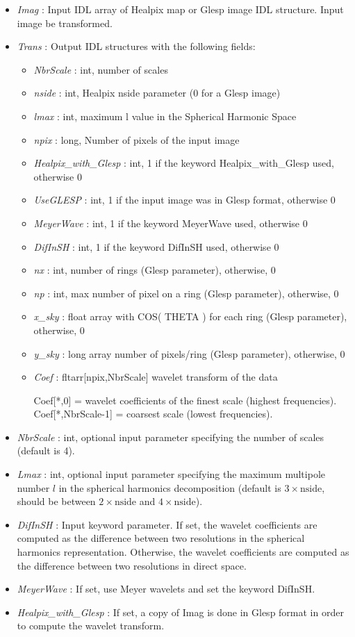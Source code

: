 \begin{itemize}
\item {\em Imag} : Input IDL array of Healpix map or Glesp image IDL structure. Input image be transformed. 
\item {\em Trans} : Output IDL structures with the following fields:
\begin{itemize}
\item {\em NbrScale} : int, number of scales
\item {\em nside} : int, Healpix nside parameter (0 for a Glesp image)
\item {\em lmax} : int, maximum l value in the Spherical Harmonic Space
\item {\em npix} : long, Number of pixels of the input image
\item {\em Healpix\_with\_Glesp} : int, 1 if the keyword Healpix\_with\_Glesp used, otherwise 0
\item {\em UseGLESP} : int, 1 if the input image was in Glesp format, otherwise 0
\item {\em MeyerWave} : int, 1 if the keyword MeyerWave used, otherwise 0
\item {\em DifInSH} : int, 1 if the keyword DifInSH used, otherwise 0
\item {\em nx} : int, number of rings (Glesp parameter), otherwise, 0
\item {\em np} : int, max number of pixel on a ring (Glesp parameter), otherwise, 0
\item {\em x\_sky} : float array with COS( THETA ) for each ring (Glesp parameter), otherwise, 0
\item {\em y\_sky} : long array number of pixels/ring (Glesp parameter), otherwise, 0
\item {\em Coef} : fltarr[npix,NbrScale] wavelet transform of the data
\begin{center}
Coef[*,0] = wavelet coefficients of the finest scale (highest frequencies).\\
Coef[*,NbrScale-1] = coarsest scale (lowest frequencies). 
\end{center}
\end{itemize}
\item {\em NbrScale} : int, optional input parameter specifying the number of scales (default is 4).
\item {\em Lmax} : int, optional input parameter specifying the maximum multipole number $l$ in the spherical harmonics decomposition 
(default is $3\times \textrm{nside}$, should be between $2\times \textrm{nside}$ and $4\times \textrm{nside}$).
\item {\em DifInSH} : Input keyword parameter. If set, the wavelet coefficients are computed as the difference between two resolutions in the spherical harmonics representation. 
Otherwise, the wavelet coefficients are computed as the difference between two resolutions in direct space.
\item {\em MeyerWave} : If set, use Meyer wavelets and set the keyword DifInSH.
\item {\em Healpix\_with\_Glesp} : If set, a copy of Imag is done in Glesp format in order to compute the wavelet transform.
\end{itemize}

